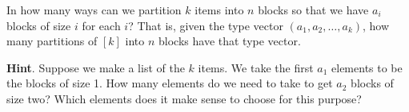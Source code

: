 \documentclass{book}
\begin{document}
\setcounter{cpjt}{276}
\addtocounter{cpjt}{-1}
\begin{activity}\label{partitionsgivenpartsize}
\hypertarget{p-1413}{}%
In how many ways can we partition \(k\) items into \(n\) blocks so that we have \(a_i\) blocks of size \(i\) for each \(i\)? That is, given the type vector \((a_1, a_2, \ldots, a_k)\), how many partitions of \([k]\) into \(n\) blocks have that type vector.%
\par\smallskip%
\noindent\textbf{Hint}.\hypertarget{hint-180}{}\quad%
\hypertarget{p-1414}{}%
Suppose we make a list of the \(k\) items. We take the first \(a_1\) elements to be the blocks of size 1. How many elements do we need to take to get \(a_2\) blocks of size two? Which elements does it make sense to choose for this purpose?%
\par\smallskip%
\noindent\end{activity}

\clearpage
\end{document}
